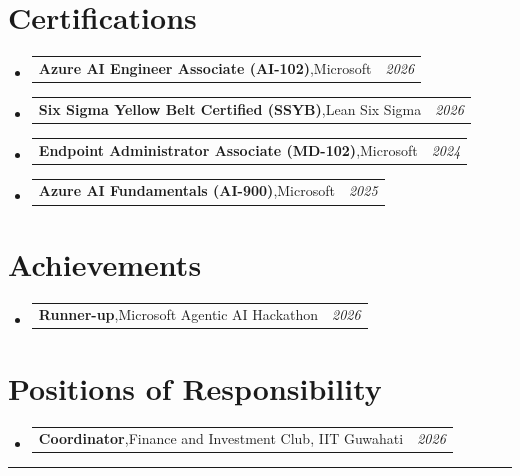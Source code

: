 \documentclass[a4paper,11pt]{article}
\makeatletter
\newcommand{\resumePOR}[3]{
\vspace{0.5mm}\item
    \begin{tabular*}{0.97\textwidth}[t]{l@{\extracolsep{\fill}}r}
        \textbf{#1},\hspace{0.3mm}#2 & \textit{\small{#3}} 
    \end{tabular*}
    \vspace{-2mm}
}
\newcommand{\resumeSubHeadingListStart}{\begin{itemize}[leftmargin=*,labelsep=0mm]}
\newcommand{\resumeSubHeadingListEnd}{\end{itemize}\vspace{2mm}}
\makeatother
\begin{document}
\section{Certifications}
\vspace{-0.2mm}
\resumeSubHeadingListStart
\resumePOR{Azure AI Engineer Associate (AI-102)}{Microsoft}{2026}
\resumePOR{Six Sigma Yellow Belt Certified (SSYB)}{Lean Six Sigma}{2026}
\resumePOR{Endpoint Administrator Associate (MD-102)}{Microsoft}{2024}
\resumePOR{Azure AI Fundamentals (AI-900)}{Microsoft}{2025}
\resumeSubHeadingListEnd
\vspace{-4mm}

\section{Achievements}
\vspace{-0.4mm}
\resumeSubHeadingListStart
\resumePOR{Runner-up}{Microsoft Agentic AI Hackathon}{2026}
\resumeSubHeadingListEnd
\vspace{-4mm}

\section{Positions of Responsibility}
\vspace{-0.4mm}
\resumeSubHeadingListStart
\resumePOR{Coordinator}{Finance and Investment Club, IIT Guwahati}{2026}
\resumeSubHeadingListEnd
\hspace*{-5mm}\rule{1.035\textwidth}{0.1mm}
\end{document}
